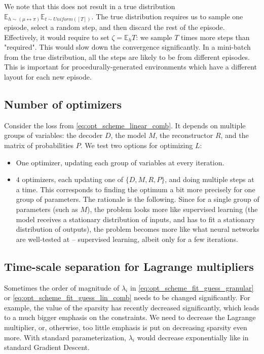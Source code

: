 \documentclass[a4paper,11pt,oneside]{report}
\begin{document}
We note that this does not result in a true distribution $\mathbb E_{h\sim (\mu\leftrightarrow\pi)}\mathbb E_{t\sim Uniform([T])}$. The true distribution requires us to sample one episode, select a random step, and then discard the rest of the episode. Effectively, it would require to set $\zeta=\mathbb E_{h}T$: we sample $T$ times more steps than "required". This would slow down the convergence significantly. In a mini-batch from the true distribution, all the steps are likely to be from different episodes. This is important for procedurally-generated environments which have a different layout for each new episode.

\subsection{Number of optimizers}
Consider the loss from \autoref{eq:opt_scheme_linear_comb}. It depends on multiple groups of variables: the decoder $D$, the model $M$, the reconstructor $R$, and the matrix of probabilities $P$. We test two options for optimizing $L$:
\begin{itemize}
    \item One optimizer, updating each group of variables at every iteration.
    \item $4$ optimizers, each updating one of $\{D,M,R,P\}$, and doing multiple steps at a time. This corresponds to finding the optimum a bit more precisely for one group of parameters. The rationale is the following. Since for a single group of parameters (such as $M$), the problem looks more like supervised learning (the model receives a stationary distribution of inputs, and has to fit a stationary distribution of outputs), the problem becomes more like what neural networks are well-tested at -- supervised learning, albeit only for a few iterations.
\end{itemize}

\subsection{Time-scale separation for Lagrange multipliers}
Sometimes the order of magnitude of $\lambda_i$ in \autoref{eq:opt_scheme_fit_guess_granular} or \autoref{eq:opt_scheme_fit_guess_lin_comb} needs to be changed significantly. For example, the value of the sparsity has recently decreased significantly, which leads to a much bigger emphasis on the constraints. We need to decrease the Lagrange multiplier, or, otherwise, too little emphasis is put on decreasing sparsity even more. With standard parameterization, $\lambda_i$ would decrease exponentially like in standard Gradient Descent.
\end{document}
